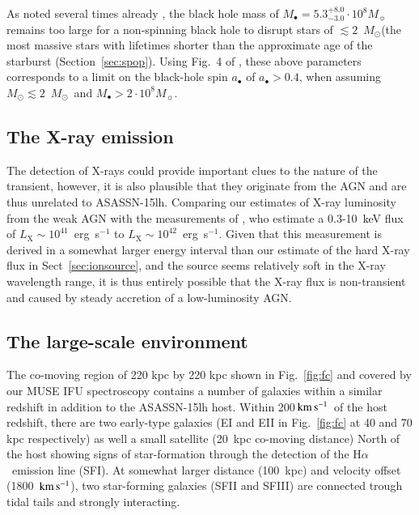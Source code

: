 \documentclass[traditabstract]{aa}
\newcommand{\kms}{$\rm{km\,s^{-1}}$}
\newcommand{\ha}{H$\alpha$}
\newcommand{\Msun}{$M_\odot$}
\begin{document}
As noted several times already \citep[e.g.][]{2015ATel.7776....1P, 2016Sci...351..257D, 2016NatAs...1E...2L}, the black hole mass of $M_\bullet = 5.3_{-3.0}^{+8.0}\cdot10^{8} M_\sun$ remains too large for a non-spinning black hole to disrupt stars of $\lesssim2$~\Msun (the most massive stars with lifetimes shorter than the approximate age of the starburst (Section~\ref{sec:spop}). Using Fig.~4 of \citet{2016NatAs...1E...2L}, these above parameters corresponds to a limit on the black-hole spin $a_\bullet$ of $a_\bullet > 0.4$, when assuming $M_\odot\lesssim2$~\Msun~and $M_\bullet > 2\cdot10^{8} M_\sun$.

\subsection{The X-ray emission}

The detection of X-rays \citep{2017ApJ...836...25M} could provide important clues to the nature of the transient, however, it is also plausible that they originate from the AGN and are thus unrelated to ASASSN-15lh. Comparing our estimates of X-ray luminosity from the weak AGN with the measurements of \citet{2017ApJ...836...25M}, who estimate a 0.3-10~keV flux of $L_{\mathrm{X}}\sim10^{41}$~erg~s$^{-1}$ to $L_{\mathrm{X}}\sim10^{42}$~erg~s$^{-1}$. Given that this measurement is derived in a somewhat larger energy interval than our estimate of the hard X-ray flux in Sect~\ref{sec:ionsource}, and the source seems relatively soft in the X-ray wavelength range, it is thus entirely possible that the X-ray flux is non-transient and caused by steady accretion of a low-luminosity AGN. 

\subsection{The large-scale environment}

The co-moving region of 220 kpc by 220 kpc shown in Fig.~\ref{fig:fc} and covered by our MUSE IFU spectroscopy contains a number of  galaxies within a similar redshift in addition to the ASASSN-15lh host. Within 200\,\kms~of the host redshift, there are two early-type galaxies (EI and EII in Fig.~\ref{fig:fc} at 40 and 70 kpc respectively) as well a small satellite (20~kpc co-moving distance) North of the host showing signs of star-formation through the detection of the \ha~emission line (SFI). At somewhat larger distance (100~kpc) and velocity offset (1800~\kms), two star-forming galaxies (SFII and SFIII) are connected trough tidal tails and strongly interacting.
\end{document}
